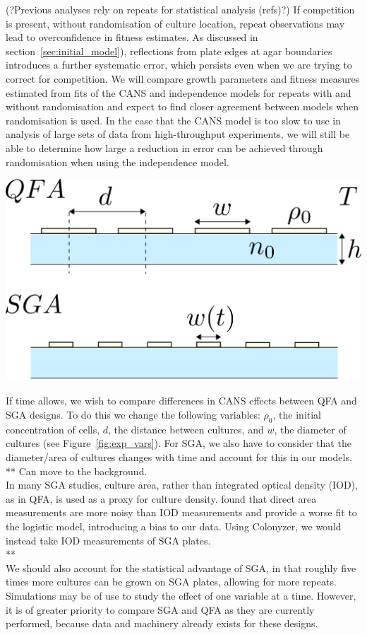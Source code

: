 (?Previous analyses rely on repeats for statistical analysis (refs)?)
If competition is present, without randomisation of culture location,
repeat observations may lead to overconfidence in fitness
estimates. As discussed in section~\ref{sec:initial_model}),
reflections from plate edges at agar boundaries introduces a further
systematic error, which persists even when we are trying to correct
for competition. We will compare growth parameters and fitness
measures estimated from fits of the CANS and independence models for
repeats with and without randomisation and expect to find closer
agreement between models when randomisation is used. In the case that
the CANS model is too slow to use in analysis of large sets of
data from high-throughput experiments, we will still be able to
determine how large a reduction in error can be achieved through
randomisation when using the independence model.

\begin{Figure}
  \centering
  \includegraphics[width=\linewidth]{qfa_v_sga_vars}
  \label{fig:exp_vars}
\end{Figure}

If time allows, we wish to compare differences in CANS effects between
QFA and SGA designs. To do this we change the following variables:
\(\rho_{0}\), the initial concentration of cells, \(d\), the distance
between cultures, and \(w\), the diameter of cultures (see
Figure~\ref{fig:exp_vars}). For SGA, we also have to consider that the
diameter/area of cultures changes with time and account for this in
our models.
\\
** Can move to the background.
\\
In many SGA studies, culture area, rather than integrated optical
density (IOD), as in QFA, is used as a proxy for culture
density. \citet{Lawless2010} found that direct area measurements are
more noisy than IOD measurements and provide a worse fit to the
logistic model, introducing a bias to our data. Using Colonyzer, we
would instead take IOD measurements of SGA plates.
\\
**
\\
We should also account for the statistical advantage of SGA, in that
roughly five times more cultures can be grown on SGA plates, allowing
for more repeats. Simulations may be of use to study the effect of one
variable at a time. However, it is of greater priority to compare SGA
and QFA as they are currently performed, because data and machinery
already exists for these designs.

